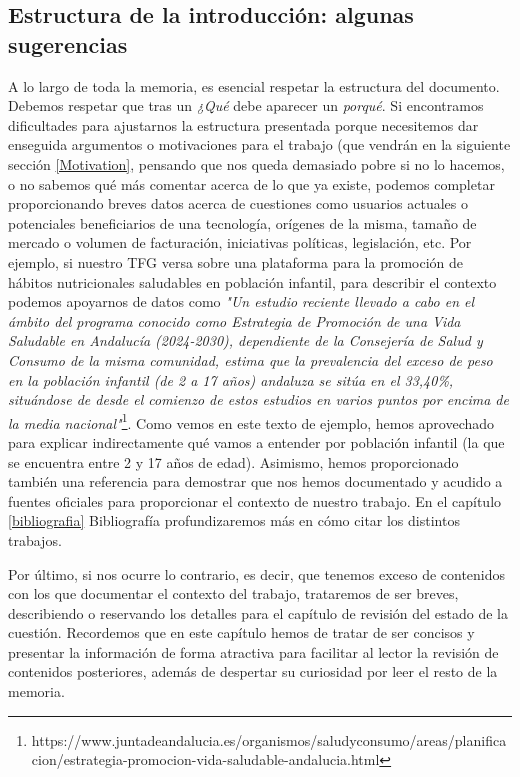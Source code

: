 \subsection{Estructura de la introducción: algunas sugerencias}
A lo largo de toda la memoria, es esencial respetar la estructura del documento. Debemos respetar que tras un \textit{¿Qué} debe aparecer un \textit{porqué}.
Si encontramos dificultades para ajustarnos la estructura presentada porque necesitemos dar enseguida argumentos o motivaciones para el trabajo (que vendrán en la siguiente sección \ref{Motivation}, pensando que nos queda demasiado pobre si no lo hacemos, o no sabemos qué más comentar acerca de lo que ya existe, podemos completar proporcionando breves datos acerca de cuestiones como usuarios actuales o potenciales beneficiarios de una tecnología, orígenes de la misma, tamaño de mercado o volumen de facturación, iniciativas políticas, legislación, etc. Por ejemplo, si nuestro TFG versa sobre una plataforma para la promoción de hábitos nutricionales saludables en población infantil, para describir el contexto podemos apoyarnos de datos como \textit{"Un estudio reciente llevado a cabo en el ámbito del programa conocido como Estrategia de Promoción de una Vida Saludable en Andalucía (2024-2030), dependiente de la Consejería de Salud y Consumo de la misma comunidad, estima que la prevalencia del exceso de peso en la población infantil (de 2 a 17 años) andaluza se sitúa en el 33,40\%, situándose de desde el comienzo de estos estudios en varios puntos por encima de la media nacional"}\footnote{https://www.juntadeandalucia.es/organismos/saludyconsumo/areas/planificacion/estrategia-promocion-vida-saludable-andalucia.html}. Como vemos en este texto de ejemplo, hemos aprovechado para explicar indirectamente qué vamos a entender por población infantil (la que se encuentra entre 2 y 17 años de edad). Asimismo, hemos proporcionado también una referencia para demostrar que nos hemos documentado y acudido a fuentes oficiales para proporcionar el contexto de nuestro trabajo. En el capítulo  \ref{bibliografia} Bibliografía profundizaremos más en cómo citar los distintos trabajos.

Por último, si nos ocurre lo contrario, es decir, que tenemos exceso de contenidos con los que documentar el contexto del trabajo, trataremos de ser breves, describiendo o reservando los detalles para el capítulo de revisión del estado de la cuestión. Recordemos que en este capítulo hemos de tratar de ser concisos y presentar la información de forma atractiva para facilitar al lector la revisión de contenidos posteriores, además de despertar su curiosidad por leer el resto de la memoria.

